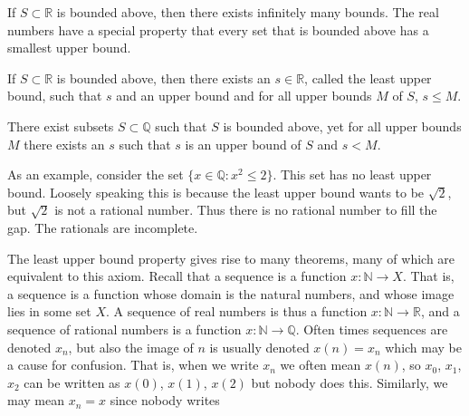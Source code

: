 \documentclass[crop=false,class=book,oneside]{standalone}
\begin{document}
            If $S\subset\mathbb{R}$ is bounded above,
            then there exists infinitely many bounds.
            The real numbers have a special property that
            every set that is bounded above has a
            smallest upper bound.
            \begin{theorem}
                If $S\subset{\mathbb{R}}$ is bounded above,
                then there exists an $s\in\mathbb{R}$,
                called the least upper bound, such that $s$
                and an upper bound and for all upper bounds
                $M$ of $S$, $s\leq{M}$.
            \end{theorem}
            \begin{theorem}
                There exist subsets $S\subset\mathbb{Q}$
                such that $S$ is bounded above, yet
                for all upper bounds $M$ there exists
                an $s$ such that $s$ is an upper
                bound of $S$ and $s<M$.
            \end{theorem}
            \begin{example}
                As an example, consider the set
                $\{x\in\mathbb{Q}:x^{2}\leq{2}\}$.
                This set has no least upper bound. Loosely
                speaking this is because the
                least upper bound wants to be $\sqrt{2}$,
                but $\sqrt{2}$ is not a rational number. Thus
                there is no rational number to fill the gap.
                The rationals are incomplete.
            \end{example}
            The least upper bound property gives rise
            to many theorems, many of which are equivalent
            to this axiom. Recall that a sequence is a
            function $x:\mathbb{N}\rightarrow{X}$. That is,
            a sequence is a function whose domain is the
            natural numbers, and whose image lies in some
            set $X$. A sequence of real numbers is thus a
            function $x:\mathbb{N}\rightarrow\mathbb{R}$,
            and a sequence of rational numbers is a function
            $x:\mathbb{N}\rightarrow\mathbb{Q}$.
            Often times sequences are denoted $x_{n}$,
            but also the image of $n$ is usually
            denoted $x(n)=x_{n}$ which may be a cause
            for confusion. That is, when we write $x_{n}$
            we often mean $x(n)$, so $x_{0}$, $x_{1}$,
            $x_{2}$ can be written as $x(0)$, $x(1)$,
            $x(2)$ but nobody does this. Similarly,
            we may mean $x_{n}=x$ since nobody writes
\end{document}

